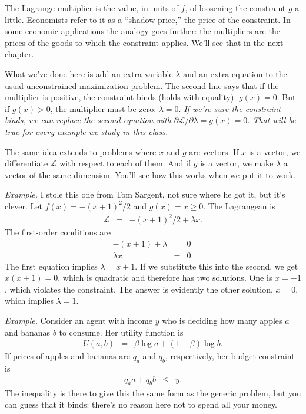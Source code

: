 The Lagrange multiplier is the value, in units of $f$,
of loosening the constraint $g$ a little.
Economists refer to it as a ``shadow price,''
the price of the constraint.
In some economic applications the analogy goes further:
the multipliers are the prices of the goods to which the constraint applies.
We'll see that in the next chapter.

What we've done here is add an extra variable $\lambda$
and an extra equation to the usual unconstrained maximization problem.
The second line says that if the multiplier is positive,
the constraint binds (holds with equality):  $g(x) = 0$.
But if $g(x) > 0$, the multiplier must be zero:  $\lambda = 0$.
{\it If we're sure the constraint binds, we can replace the second equation
with $ \partial \mathcal{L}/\partial \lambda = g(x) = 0$.
That will be true for every example we study in this class.\/}

The same idea extends to problems where $x$ and $g$
are vectors.
If $x$ is a vector, we differentiate $\mathcal{L}$ with
respect to each of them.
And if $g$ is a vector, we make $\lambda$ a vector of the same
dimension.
You'll see how this works when we put it to work.


{\it Example.\/}
I stole this one from Tom Sargent, not sure where he got it, but it's clever.
Let $f(x) =- (x+1)^2/2$  and $g(x) = x \geq 0$.
The Lagrangean is
\begin{eqnarray*}
    \mathcal{L} &=& - (x+1)^2/2 + \lambda x .
\end{eqnarray*}
The first-order conditions are
\begin{eqnarray*}
    -(x+1) + \lambda &=& 0 \\
    \lambda x &=& 0.
\end{eqnarray*}
The first equation implies $\lambda = x + 1$.
If we substitute this into the second, we get $x(x+1) = 0$,
which is quadratic and therefore has two solutions.
One is $x=-1$, which violates the constraint.
The answer is evidently the other solution, $x=0$, which implies $\lambda = 1$.


{\it Example.\/}
Consider an agent with income $y$ who is deciding
how many apples $a$ and bananas $b$ to consume.
Her utility function is
\begin{eqnarray*}
    U(a,b) &=& \beta \log a + (1-\beta) \log b .
\end{eqnarray*}
If prices of apples and bananas are $q_a$ and $q_b$,
respectively, her budget constraint is
\begin{eqnarray*}
    q_a a + q_b b  &\leq& y  .
\end{eqnarray*}
The inequality is there to give this the same form as the
generic problem, but you can guess that it binds:
there's no reason here not to spend all your money.

